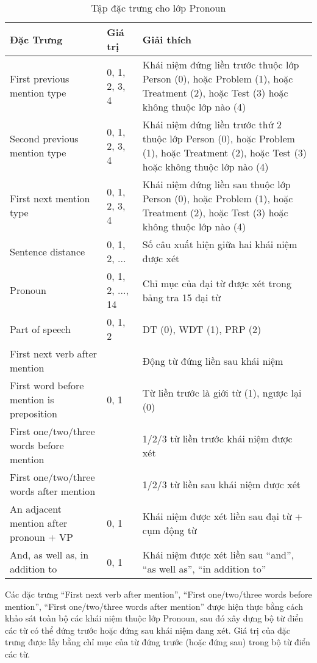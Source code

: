\begin{table}[th]
\centering{}
\caption{Tập đặc trưng cho lớp Pronoun \label{tab:PronounFeatures}}
\footnotesize\sffamily

\begin{tabularx}{\textwidth}{@{}P{\raggedright}{0.3}lL@{}}
\toprule 
\textbf{Đặc Trưng} & \textbf{Giá trị} & \textbf{Giải thích}\\
\midrule
First previous mention type & 0, 1, 2, 3, 4 & Khái niệm đứng liền trước thuộc lớp Person (0), hoặc Problem (1), hoặc Treatment (2), hoặc Test (3) hoặc không thuộc lớp nào (4)\\
Second previous mention type & 0, 1, 2, 3, 4 & Khái niệm đứng liền trước thứ 2 thuộc lớp Person (0), hoặc Problem (1), hoặc Treatment (2), hoặc Test (3) hoặc không thuộc lớp nào (4)\\
First next mention type & 0, 1, 2, 3, 4 & Khái niệm đứng liền sau thuộc lớp Person (0), hoặc Problem (1), hoặc Treatment (2), hoặc Test (3) hoặc không thuộc lớp nào (4)\\
Sentence distance & 0, 1, 2, ... & Số câu xuất hiện giữa hai khái niệm được xét\\
Pronoun & 0, 1, 2, ..., 14 & Chỉ mục của đại từ được xét trong bảng tra 15 đại từ\\
Part of speech & 0, 1, 2 & DT (0), WDT (1), PRP (2)\\
First next verb after mention & & Động từ đứng liền sau khái niệm\\
First word before mention is preposition & 0, 1 & Từ liền trước là giới từ (1), ngược lại (0)\\
First one/two/three words before mention & & 1/2/3 từ liền trước khái niệm được xét\\
First one/two/three words after mention & & 1/2/3 từ liền sau khái niệm được xét\\
An adjacent mention after pronoun + VP  & 0, 1 & Khái niệm được xét liền sau đại từ + cụm động từ\\
And, as well as, in addition to & 0, 1 & Khái niệm được xét liền sau ``and'', ``as well as'', ``in addition to''\\
\bottomrule
\end{tabularx}
\end{table}

Các đặc trưng ``First next verb after mention'', ``First one/two/three words before mention'', ``First one/two/three words after mention'' được hiện thực bằng cách khảo sát toàn bộ các khái niệm thuộc lớp Pronoun, sau đó xây dựng bộ từ điển các từ có thể đứng trước hoặc đứng sau khái niệm đang xét. Giá trị của đặc trưng được lấy bằng chỉ mục của từ đứng trước (hoặc đứng sau) trong bộ từ điển các từ.

